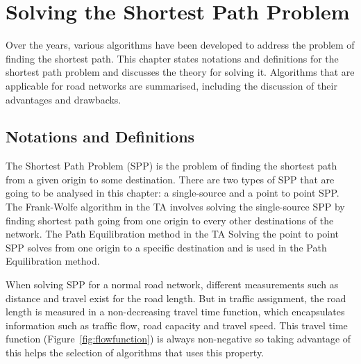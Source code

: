 \chapter{Solving the Shortest Path Problem}
\label{chap:solvingspp}

Over the years,
various algorithms have been developed 
to address the problem of finding the shortest path.
This chapter states notations and definitions for the shortest path problem and discusses
the theory for solving it.
Algorithms that are applicable for road networks are summarised,
including the discussion of their advantages and drawbacks.

\section{Notations and Definitions}
The Shortest Path Problem (SPP) is the problem of finding the shortest path from a given origin  to some destination.
There are two types of SPP that are going to
be analysed in this chapter:
a single-source and a point to point SPP.  
The Frank-Wolfe algorithm in the TA involves
solving the single-source SPP by finding shortest path going from one origin to every other destinations of the network.
The Path Equilibration method in the TA
Solving the point to point SPP solves from one origin to a specific destination and is used in the Path Equilibration method. 

When solving SPP for a normal road network,
different measurements such as distance and travel exist for the road length.
But in traffic assignment,
the road length is measured in a non-decreasing travel time function,
which encapsulates information such as traffic flow, road capacity and travel speed.
This travel time function (Figure~\ref{fig:flowfunction}) is always non-negative so taking advantage of this helps the selection of algorithms that uses this property.

